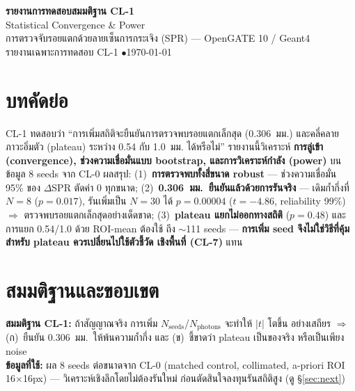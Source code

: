 \documentclass[14pt]{extarticle}
\begin{document}
\begin{center}
{\LARGE\bfseries\color{theme} รายงานการทดสอบสมมติฐาน CL-1}\\[3pt]
{\Large Statistical Convergence \& Power}\\[5pt]
{\small การตรวจจับรอยแตกด้วยลายเซ็นการกระเจิง (SPR) --- OpenGATE 10 / Geant4}\\
{\small รายงานเฉพาะการทดสอบ CL-1 \quad$\bullet$\quad \today}
\end{center}
\vspace{2pt}{\color{theme!45}\hrule}\vspace{8pt}

\section*{บทคัดย่อ}
CL-1 ทดสอบว่า ``การเพิ่มสถิติจะยืนยันการตรวจพบรอยแตกเล็กสุด (0.306~มม.) และคลี่คลายภาวะอิ่มตัว
(plateau) ระหว่าง 0.54 กับ 1.0~มม. ได้หรือไม่'' รายงานนี้วิเคราะห์ \textbf{การลู่เข้า (convergence),
ช่วงความเชื่อมั่นแบบ bootstrap, และการวิเคราะห์กำลัง (power)} บนข้อมูล 8 seeds จาก CL-0 ผลสรุป:
(1)~\textbf{การตรวจพบทั้งสี่ขนาด robust} --- ช่วงความเชื่อมั่น 95\% ของ $\Delta$SPR ตัดค่า 0 ทุกขนาด;
(2)~\textbf{0.306~มม.\ ยืนยันแล้วด้วยการรันจริง} --- เดิมก้ำกึ่งที่ $N=8$ ($p=0.017$), รันเพิ่มเป็น $N=30$
ได้ \textbf{$p=0.00004$} ($t=-4.86$, reliability 99\%) $\Rightarrow$ ตรวจพบรอยแตกเล็กสุดอย่างเด็ดขาด;
(3)~\textbf{plateau แยกไม่ออกทางสถิติ} ($p=0.48$) และการแยก 0.54/1.0 ด้วย ROI-mean ต้องใช้
ถึง $\sim$111 seeds --- \textbf{การเพิ่ม seed จึงไม่ใช่วิธีที่คุ้มสำหรับ plateau ควรเปลี่ยนไปใช้ตัวชี้วัด
เชิงพื้นที่ (CL-7)} แทน

\section{สมมติฐานและขอบเขต}
\textbf{สมมติฐาน CL-1:} ถ้าสัญญาณจริง การเพิ่ม $N_{\text{seeds}}$/$N_{\text{photons}}$ จะทำให้ $|t|$ โตขึ้น
อย่างเสถียร $\Rightarrow$ (ก)~ยืนยัน 0.306~มม.\ ให้พ้นความก้ำกึ่ง และ (ข)~ชี้ขาดว่า plateau เป็นของจริง
หรือเป็นเพียง noise\\
\textbf{ข้อมูลที่ใช้:} ผล 8 seeds ต่อขนาดจาก CL-0 (matched control, collimated, a-priori ROI 16$\times$16px)
--- วิเคราะห์เชิงลึกโดยไม่ต้องรันใหม่ ก่อนตัดสินใจลงทุนรันสถิติสูง (ดู \S\ref{sec:next})
\end{document}
